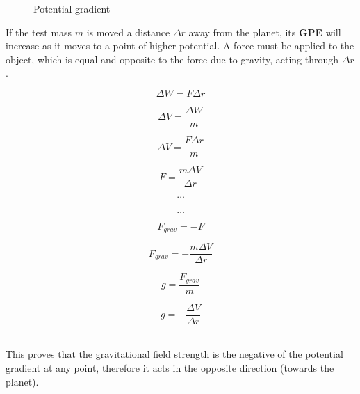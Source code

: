 \documentclass[12pt]{article}
\begin{document}
\begin{figure}[H]
\centering
{}
\caption{Potential gradient}
\label{img:potential_step}
\end{figure}

If the test mass \(m\) is moved a distance \(\Delta r\) away from the planet, its \textbf{GPE} will increase as it moves to a point of higher potential. A force must be applied to the object, which is equal and opposite to the force due to gravity, acting through \(\Delta r\).

\begin{figure}[H]
\vspace{5mm}
\centering
\begin{minipage}{.8\textwidth}
\begin{tcolorbox}[
sharp corners=all,
colback=white,
colframe=white,
size=tight,
boxrule=0.2mm,
left=10mm, right=10mm
]
\begin{multicols}{2}
\noindent
\[\Delta W = F \Delta r\]

\[\Delta V = \dfrac{\Delta W}{m}\]

\[\Delta V = \dfrac{F \Delta r}{m}\]

\[F = \dfrac{m \Delta V}{\Delta r}\]

\[\textbf{\ldots}\]
\columnbreak
\\
\[\textbf{\ldots}\]

\[F_{grav} = -F\]

\[F_{grav} = - \dfrac{m \Delta V}{\Delta r}\]

\[g = \dfrac{F_{grav}}{m}\]

\[g = - \dfrac{\Delta V}{\Delta r}\]
\\

\end{multicols}
\end{tcolorbox}
\end{minipage}
\end{figure}
This proves that the gravitational field strength is the negative of the potential gradient at any point, therefore it acts in the opposite direction (towards the planet).
\end{document}
